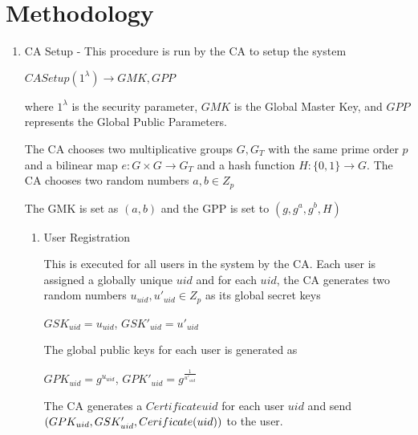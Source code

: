 \chapter{Methodology}
\label{chap:methodology}

\renewcommand{\theenumi}{\Alph{enumi}}
\renewcommand{\theenumii}{\roman{enumii}}
\begin{enumerate}
	
	\item CA Setup - This procedure is run by the CA to setup the system
	
	\begin{center}
		$ CASetup(1^{\lambda}) \longrightarrow GMK, GPP $
	\end{center}
	
	where $ 1^{\lambda} $ is the security parameter, $ GMK $ is the Global Master Key, and $ GPP $ represents the Global Public Parameters.
	
	The CA chooses two multiplicative groups $ G, G_{T} $ with the same prime order $ p $ and a bilinear map $ e \colon G \times G \rightarrow G_{T} $ and a hash function $ H \colon \{0, 1\} \rightarrow G. $ The CA chooses two random numbers $ a, b \in Z_{p} $
	
	The GMK is set as $ (a, b) $ and the GPP is set to $ (g, g^{a}, g^{b}, H) $
	
	\begin{enumerate}
		
		\item User Registration
		
		This is executed for all users in the system by the CA. Each user is assigned a globally unique $ uid $ and for each $ uid $, the CA generates two random numbers $ u_{uid}, u'_{uid} \in Z_{p} $ as its global secret keys
		
		\begin{center}
			$ GSK_{uid} = u_{uid} $, $ GSK'_{uid} = u'_{uid} $
		\end{center}
		
		The global public keys for each user is generated as 
		
		\begin{center}
			$ GPK_{uid} = g^{u_{uid}} $, $ GPK'_{uid} = g^{\frac{1}{u'_{uid}}} $
		\end{center}
		
		The CA generates a $ Certificate{uid} $ for each user $ uid $ and send $ (GPK_{uid}, GSK'_{uid}, \\ Cerificate(uid)) $ to the user.
		

\end{enumerate}
\end{enumerate}
